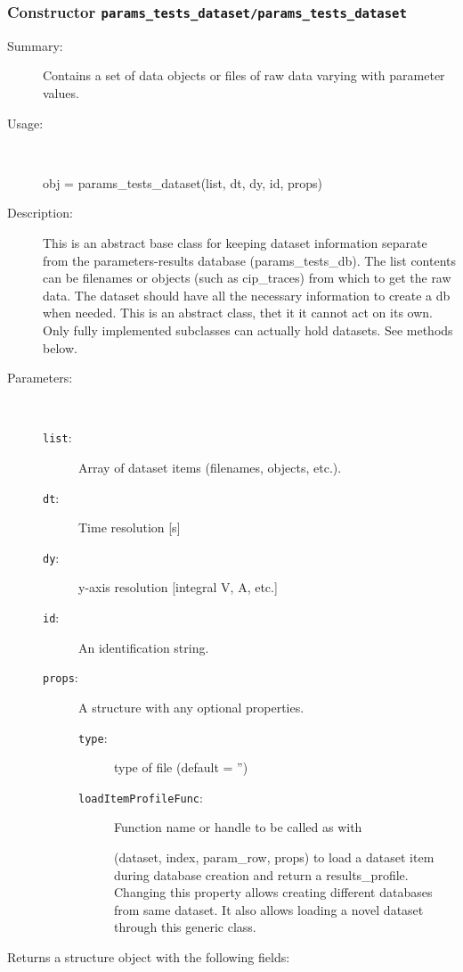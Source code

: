 \subsubsection[Constructor \texttt{params\_tests\_dataset}]{Constructor \texttt{params\_tests\_dataset/params\_tests\_dataset}}%
%
\label{ref_params_tests_dataset__params_tests_dataset}%
\hypertarget{ref_params_tests_dataset__params_tests_dataset}{}%
\begin{description}
\item[Summary:]Contains a set of data objects or files of raw data varying with parameter values.
%
\item[Usage:]~%
\begin{lyxcode}%
obj = params\_tests\_dataset(list, dt, dy, id, props)
%
\end{lyxcode}%
%
\item[Description:]%
This is an abstract base class for keeping dataset information separate
 from the parameters-results database (params\_tests\_db). The list contents
 can be filenames or objects (such as cip\_traces) from which to get the raw data.
 The dataset should have all the necessary information to create a db when
 needed. This is an abstract class, thet it it cannot act on its own. Only 
 fully implemented subclasses can actually hold datasets. See methods below.
\item[Parameters:]~
\begin{description}%
\item[\texttt{list}:]
 Array of dataset items (filenames, objects, etc.).
\item[\texttt{dt}:]
 Time resolution [s]
\item[\texttt{dy}:]
 y-axis resolution [integral V, A, etc.]
\item[\texttt{id}:]
 An identification string.
\item[\texttt{props}:]
 A structure with any optional properties.
\begin{description}%
\item[\texttt{type}:]
 type of file (default = '')
\item[\texttt{loadItemProfileFunc}:]
 Function name or handle to be called as with

(dataset, index, param\_row, props) to load a dataset item during database
creation and return a results\_profile. Changing this property allows creating
different databases from same dataset. It also
allows loading a novel dataset through this generic class.
\end{description}%
\end{description}%
%
\item[Returns a structure object with the following fields:
]~


\end{description}
